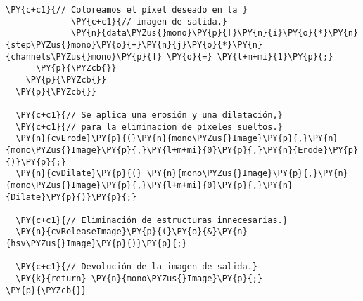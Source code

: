\begin{Verbatim}[commandchars=\\\{\}]
             \PY{c+c1}{// Coloreamos el píxel deseado en la }
             \PY{c+c1}{// imagen de salida.}
             \PY{n}{data\PYZus{}mono}\PY{p}{[}\PY{n}{i}\PY{o}{*}\PY{n}{step\PYZus{}mono}\PY{o}{+}\PY{n}{j}\PY{o}{*}\PY{n}{channels\PYZus{}mono}\PY{p}{]} \PY{o}{=} \PY{l+m+mi}{1}\PY{p}{;}
      \PY{p}{\PYZcb{}}
    \PY{p}{\PYZcb{}}
  \PY{p}{\PYZcb{}}

  \PY{c+c1}{// Se aplica una erosión y una dilatación,}
  \PY{c+c1}{// para la eliminacion de píxeles sueltos.}
  \PY{n}{cvErode}\PY{p}{(}\PY{n}{mono\PYZus{}Image}\PY{p}{,}\PY{n}{mono\PYZus{}Image}\PY{p}{,}\PY{l+m+mi}{0}\PY{p}{,}\PY{n}{Erode}\PY{p}{)}\PY{p}{;}
  \PY{n}{cvDilate}\PY{p}{(} \PY{n}{mono\PYZus{}Image}\PY{p}{,}\PY{n}{mono\PYZus{}Image}\PY{p}{,}\PY{l+m+mi}{0}\PY{p}{,}\PY{n}{Dilate}\PY{p}{)}\PY{p}{;}

  \PY{c+c1}{// Eliminación de estructuras innecesarias.}
  \PY{n}{cvReleaseImage}\PY{p}{(}\PY{o}{&}\PY{n}{hsv\PYZus{}Image}\PY{p}{)}\PY{p}{;}

  \PY{c+c1}{// Devolución de la imagen de salida.}
  \PY{k}{return} \PY{n}{mono\PYZus{}Image}\PY{p}{;}
\PY{p}{\PYZcb{}}
\end{Verbatim}
